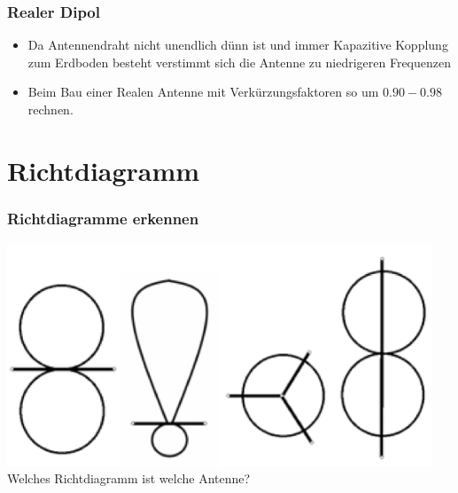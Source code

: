 \begin{frame}
  \frametitle{Realer Dipol}
  \begin{center}
    \begin{itemize}
      \item Da Antennendraht nicht unendlich dünn ist und immer Kapazitive Kopplung zum Erdboden besteht verstimmt sich die Antenne zu niedrigeren Frequenzen
      \item Beim Bau einer Realen Antenne mit Verkürzungsfaktoren so um $0.90-0.98$ rechnen.
    \end{itemize}
  \end{center}
\end{frame}

\section*{Richtdiagramm}

\begin{frame}
  \frametitle{Richtdiagramme erkennen}
  \begin{center}
    \includegraphics[width=0.95\textwidth]{a09/Abstrahl.png}
    \tiny \hyperlink{refs}{\cite{bna}} \\[1em] \large Welches Richtdiagramm ist welche Antenne?
  \end{center}
\end{frame}

